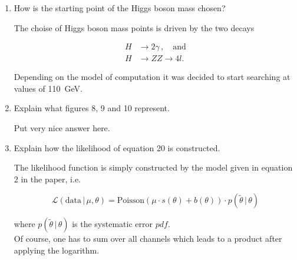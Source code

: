 \documentclass[10pt]{article}
\newenvironment{myfont}{\fontfamily{put}\selectfont}{\par}
\begin{document}
\begin{myfont}
\begin{enumerate}[label = \textbf{\roman*}.]
  \item How is the starting point of the Higgs boson mass chosen?

  \noindent The choise of Higgs boson mass points is driven by the two decays

  \begin{align*}
  	H & \rightarrow 2\gamma \, , \quad \textrm{and} \\
  	H & \rightarrow ZZ \rightarrow 4l.
  \end{align*}

  \noindent Depending on the model of computation it was decided to start searching at values of \SI{110}{\giga\electronvolt}.

  \item Explain what figures 8, 9 and 10 represent.

  \noindent Put very nice answer here.

  \item Explain how the likelihood of equation 20 is constructed.

  \noindent The likelihood function is simply constructed by the model given in equation 2 in the paper, i.e.

  \begin{equation}
  	\mathcal{L}\left(\textrm{data}\,|\,\mu, \theta\right) = \textrm{Poisson}\left(\mu \cdot s(\theta) + b(\theta)\right) \cdot p(\tilde{\theta}\, | \, \theta)
  \end{equation}

  \noindent where $p(\tilde{\theta}\,|\,\theta)$ is the systematic error $pdf$. \\
  Of course, one has to sum over all channels which leads to a product after applying the logarithm.
\end{enumerate}


\end{myfont}
\end{document}

